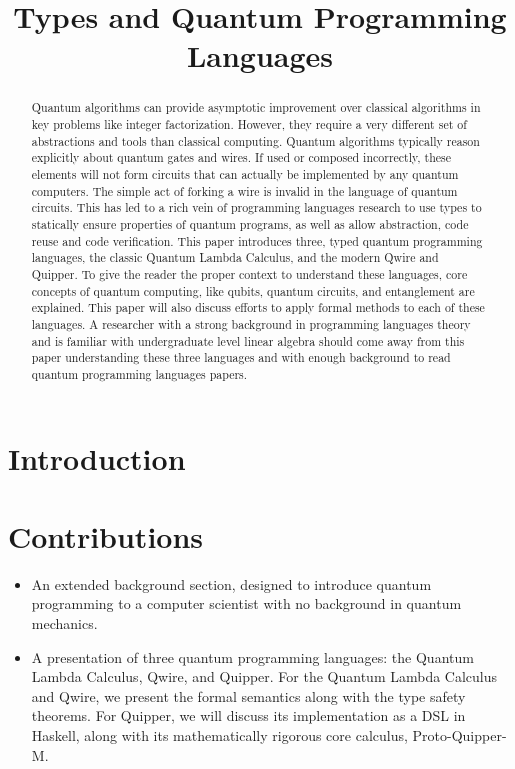 \documentclass[acmsmall,screen,review]{acmart}
\begin{document}
\title{Types and Quantum Programming Languages}
\begin{abstract}
Quantum algorithms can provide asymptotic improvement over classical algorithms in key problems like integer factorization. However, they require a very different set of abstractions and tools than classical computing. Quantum algorithms typically reason explicitly about quantum gates and wires. If used or composed incorrectly, these elements will not form circuits that can actually be implemented by any quantum computers. The simple act of forking a wire is invalid in the language of quantum circuits. This has led to a rich vein of programming languages research to use types to statically ensure properties of quantum programs, as well as allow abstraction, code reuse and code verification. This paper introduces three, typed quantum programming languages, the classic Quantum Lambda Calculus, and the modern Qwire and Quipper. To give the reader the proper context to understand these languages, core concepts of quantum computing, like qubits, quantum circuits, and entanglement are explained. This paper will also discuss efforts to apply formal methods to each of these languages. A researcher with a strong background in programming languages theory and is familiar with undergraduate level linear algebra should come away from this paper understanding these three languages and with enough background to read quantum programming languages papers.
\end{abstract}

\maketitle
\section{Introduction}

\section{Contributions}
\begin{itemize}
\item An extended background section, designed to introduce quantum programming to a computer scientist with no background in quantum mechanics.
\item A presentation of three quantum programming languages: the Quantum Lambda Calculus, Qwire, and Quipper. For the Quantum Lambda Calculus and Qwire, we present the formal semantics along with the type safety theorems. For Quipper, we will discuss its implementation as  a DSL in Haskell, along with its mathematically rigorous core calculus, Proto-Quipper-M.
\end{itemize}
\end{document}
